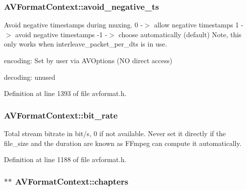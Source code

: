 \subsubsection[{\texorpdfstring{avoid\+\_\+negative\+\_\+ts}{avoid_negative_ts}}]{ A\+V\+Format\+Context\+::avoid\+\_\+negative\+\_\+ts}\hypertarget{struct_a_v_format_context_a032c7d859883eddc9d87a9e3b2cc3853}{}\label{struct_a_v_format_context_a032c7d859883eddc9d87a9e3b2cc3853}
Avoid negative timestamps during muxing. 0 -\/$>$ allow negative timestamps 1 -\/$>$ avoid negative timestamps -\/1 -\/$>$ choose automatically (default) Note, this only works when interleave\+\_\+packet\+\_\+per\+\_\+dts is in use.
\begin{DoxyItemize}
\item encoding\+: Set by user via A\+V\+Options (NO direct access)
\item decoding\+: unused 
\end{DoxyItemize}

Definition at line 1393 of file avformat.\+h.

\subsubsection[{\texorpdfstring{bit\+\_\+rate}{bit_rate}}]{ A\+V\+Format\+Context\+::bit\+\_\+rate}\hypertarget{struct_a_v_format_context_a4f7a7b9b1313907c88e62b03f3e569e6}{}\label{struct_a_v_format_context_a4f7a7b9b1313907c88e62b03f3e569e6}
Total stream bitrate in bit/s, 0 if not available. Never set it directly if the file\+\_\+size and the duration are known as F\+Fmpeg can compute it automatically. 

Definition at line 1188 of file avformat.\+h.

\subsubsection[{\texorpdfstring{chapters}{chapters}}]{$\ast$$\ast$ A\+V\+Format\+Context\+::chapters}\hypertarget{struct_a_v_format_context_ac17d5fc2dcdb00806cc83b02d9f940f3}{}\label{struct_a_v_format_context_ac17d5fc2dcdb00806cc83b02d9f940f3}


